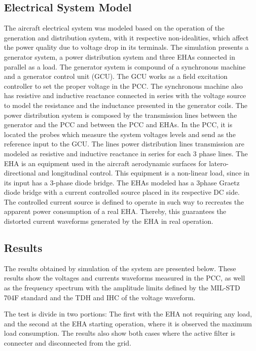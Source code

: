 \subsection{Electrical System Model}

The aircraft electrical system was modeled based on the operation of the generation and distribution system, with it respective non-idealities, which affect the power quality due to voltage drop in its terminals. The simulation presents a generator system, a power distribution system and three EHAs connected in parallel as a load.
The generator system is compound of a synchronous machine and a generator control unit (GCU). The GCU works as a field excitation controller to set the proper voltage in the PCC. The synchronous machine also has resistive and inductive reactance connected in series with the voltage source to model the resistance and the inductance presented in the generator coils.
The power distribution system is composed by the transmission lines between the generator and the PCC and between the PCC and EHAs. In the PCC, it is located the probes which measure the system voltages levels and send as the reference input to the GCU. The lines power distribution lines transmission are modeled as resistive and inductive reactance in series for each 3 phase lines.
The EHA is an equipment used in the aircraft aerodynamic surfaces for latero-directional and longitudinal control. This equipment is a non-linear load, since in its input has a 3-phase diode bridge. The EHAs modeled has a 3phase Graetz diode bridge with a current controlled source placed in its respective DC side. The controlled current source is defined to operate in such way to recreates the apparent power consumption of a real EHA. Thereby, this guarantees the distorted current waveforms generated by the EHA in real operation.

\subsection{Results}

The results obtained by simulation of the system are presented below. These results show the voltages and currents waveforms measured in the PCC, as well as the frequency spectrum with the amplitude limits defined by the MIL-STD 704F standard and the TDH and IHC of the voltage waveform.

The test is divide in two portions: The first with the EHA not requiring any load, and the second at the EHA starting operation, where it is observed the maximum load consumption. The results also show both cases where the active filter is connecter and disconnected from the grid.


